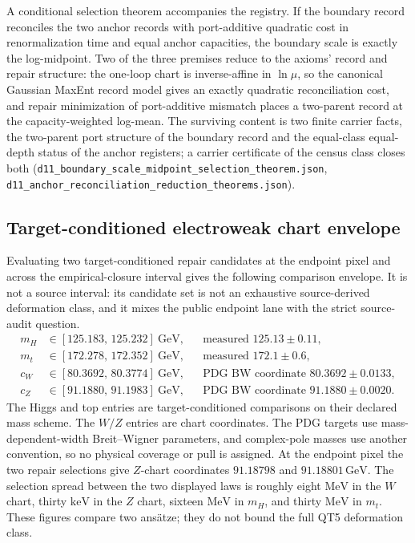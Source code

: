 \documentclass[11pt]{article}
\begin{document}
A conditional selection theorem accompanies the registry.  If the boundary
record reconciles the two anchor records with port-additive quadratic cost
in renormalization time and equal anchor capacities, the boundary scale is
exactly the log-midpoint.  Two of the three premises reduce to the axioms'
record and repair structure: the one-loop chart is inverse-affine in
\(\ln\mu\), so the canonical Gaussian MaxEnt record model gives an exactly
quadratic reconciliation cost, and repair minimization of port-additive
mismatch places a two-parent record at the capacity-weighted log-mean.  The
surviving content is two finite carrier facts, the two-parent port structure
of the boundary record and the equal-class equal-depth status of the anchor
registers; a carrier certificate of the census class closes both
(\texttt{d11\_boundary\_scale\_midpoint\_selection\_theorem.json},
\texttt{d11\_anchor\_reconciliation\_reduction\_theorems.json}).

\subsection{Target-conditioned electroweak chart envelope}\label{ew-conditional-envelope}

Evaluating two target-conditioned repair candidates at the endpoint pixel and across
the empirical-closure interval gives the following comparison envelope.
It is not a source interval: its candidate set is not an exhaustive
source-derived deformation class, and it mixes the public endpoint lane with
the strict source-audit question.
\[
\begin{aligned}
m_H &\in [125.183,\,125.232]~\mathrm{GeV}, & &\text{measured } 125.13\pm0.11,\\
m_t &\in [172.278,\,172.352]~\mathrm{GeV}, & &\text{measured } 172.1\pm0.6,\\
c_W &\in [80.3692,\,80.3774]~\mathrm{GeV}, & &\text{PDG BW coordinate } 80.3692\pm0.0133,\\
c_Z &\in [91.1880,\,91.1983]~\mathrm{GeV}, & &\text{PDG BW coordinate } 91.1880\pm0.0020.
\end{aligned}
\]
The Higgs and top entries are target-conditioned comparisons on their declared mass scheme. The
\(W/Z\) entries are chart coordinates. The PDG targets use mass-dependent-width Breit--Wigner
parameters, and complex-pole masses use another convention, so no physical coverage or pull is
assigned. At the endpoint pixel the two repair selections give \(Z\)-chart coordinates
\(91.18798\) and \(91.18801\,\mathrm{GeV}\). The selection spread between the two displayed laws is
roughly eight \(\mathrm{MeV}\) in the \(W\) chart, thirty \(\mathrm{keV}\) in the \(Z\) chart, sixteen
\(\mathrm{MeV}\) in \(m_H\), and thirty \(\mathrm{MeV}\) in \(m_t\).  These
figures compare two ans\"atze; they do not bound the full QT5 deformation
class.
\end{document}
